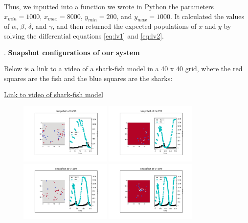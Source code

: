 \documentclass{article}
\begin{document}
Thus, we inputted into a function we wrote in Python the parameters $x_{min} = 1000$, $x_{max} = 8000$, $y_{min} = 200$, and $y_{max} = 1000$. It calculated the values of $\alpha$, $\beta$, $\delta$, and $\gamma$, and then returned the expected populations of $x$ and $y$ by solving the differential equations \ref{eq:lv1} and \ref{eq:lv2}.\par
\bigskip
{}. \textbf{Snapshot configurations of our system}\par
Below is a link to a video of a shark-fish model in a 40 x 40 grid, where the red squares are the fish and the blue squares are the sharks:\par
\href{https://github.com/LingfeiZhao/Group-Project-2b/blob/master/results/animationwithplot.mp4}{Link to video of shark-fish model}\par
\begin{figure}[htp]
    \centering
    \includegraphics[width=0.4\textwidth]{99.png} 
    \includegraphics[width=0.4\textwidth]{199.png} 
    \includegraphics[width=0.4\textwidth]{299.png} 
    \includegraphics[width=0.4\textwidth]{399.png}

\end{figure}
\end{document}
